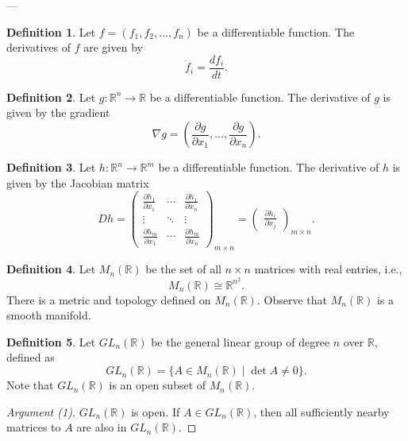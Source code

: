 \documentclass[11pt]{article}
\theoremstyle{definition}
\newtheorem{definition}{Definition}[section]
\theoremstyle{remark}
\begin{document}
---

\begin{definition}
Let $f = (f_1, f_2, \ldots, f_n)$ be a differentiable function. The derivatives of $f$ are given by
\[
\dot{f}_i = \frac{df_i}{dt}.
\]
\end{definition}

\begin{definition}
Let $g: \mathbb{R}^n \to \mathbb{R}$ be a differentiable function. The derivative of $g$ is given by the gradient
\[
\nabla g = \left( \frac{\partial g}{\partial x_1}, \ldots, \frac{\partial g}{\partial x_n} \right).
\]
\end{definition}

\begin{definition}
Let $h: \mathbb{R}^n \to \mathbb{R}^m$ be a differentiable function. The derivative of $h$ is given by the Jacobian matrix
\[
Dh = \begin{pmatrix}
\frac{\partial h_1}{\partial x_1} & \cdots & \frac{\partial h_1}{\partial x_n} \\
\vdots & \ddots & \vdots \\
\frac{\partial h_m}{\partial x_1} & \cdots & \frac{\partial h_m}{\partial x_n}
\end{pmatrix}_{m \times n}
=
\begin{pmatrix}
\frac{\partial h_i}{\partial x_j}
\end{pmatrix}_{m \times n}.
\]
\end{definition}

\begin{definition}
Let $M_n(\mathbb{R})$ be the set of all $n \times n$ matrices with real entries, i.e.,
\[
M_n(\mathbb{R}) \cong \mathbb{R}^{n^2}.
\]
There is a metric and topology defined on $M_n(\mathbb{R})$. Observe that $M_n(\mathbb{R})$ is a smooth manifold.
\end{definition}

\begin{definition}
Let $GL_n(\mathbb{R})$ be the general linear group of degree $n$ over $\mathbb{R}$, defined as
\[
GL_n(\mathbb{R}) = \{ A \in M_n(\mathbb{R}) \mid \det A \neq 0 \}.
\]
Note that $GL_n(\mathbb{R})$ is an open subset of $M_n(\mathbb{R})$.
\end{definition}

\begin{proof}[Argument (1)]
$GL_n(\mathbb{R})$ is open. If $A \in GL_n(\mathbb{R})$, then all sufficiently nearby matrices to $A$ are also in $GL_n(\mathbb{R})$.
\end{proof}
\end{document}
